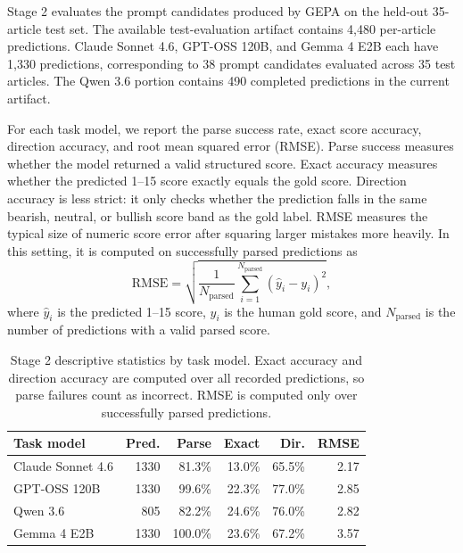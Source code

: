 \documentclass[sigconf,screen]{acmart}
\renewcommand{\arraystretch}{1.05}
\begin{document}
Stage 2 evaluates the prompt candidates produced by GEPA on the held-out
35-article test set. The available test-evaluation artifact contains 4,480
per-article predictions. Claude Sonnet 4.6, GPT-OSS 120B, and Gemma 4 E2B each
have 1,330 predictions, corresponding to 38 prompt candidates evaluated across
35 test articles. The Qwen 3.6 portion contains 490 completed predictions in
the current artifact.

For each task model, we report the parse success rate, exact score accuracy,
direction accuracy, and root mean squared error (RMSE). Parse success measures
whether the model returned a valid structured score. Exact accuracy measures
whether the predicted 1--15 score exactly equals the gold score. Direction
accuracy is less strict: it only checks whether the prediction falls in the
same bearish, neutral, or bullish score band as the gold label. RMSE measures
the typical size of numeric score error after squaring larger mistakes more
heavily. In this setting, it is computed on successfully parsed predictions as
\begin{equation}
\mathrm{RMSE}
=
\sqrt{
\frac{1}{N_{\mathrm{parsed}}}
\sum_{i=1}^{N_{\mathrm{parsed}}}
(\hat{y}_i - y_i)^2
},
\end{equation}
where $\hat{y}_i$ is the predicted 1--15 score, $y_i$ is the human gold score,
and $N_{\mathrm{parsed}}$ is the number of predictions with a valid parsed
score.

\begin{table}[t]
    \centering
    \small
    \setlength{\tabcolsep}{3pt}
    \renewcommand{\arraystretch}{1.1}
    \begin{tabular}{lrrrrr}
        \hline
        \textbf{Task model} & \textbf{Pred.} & \textbf{Parse} &
        \textbf{Exact} & \textbf{Dir.} & \textbf{RMSE} \\
        \hline
        Claude Sonnet 4.6 & 1330 & 81.3\% & 13.0\% & 65.5\% & 2.17 \\
        GPT-OSS 120B & 1330 & 99.6\% & 22.3\% & 77.0\% & 2.85 \\
        Qwen 3.6 & 805 & 82.2\% & 24.6\% & 76.0\% & 2.82 \\
        Gemma 4 E2B & 1330 & 100.0\% & 23.6\% & 67.2\% & 3.57 \\
        \hline
    \end{tabular}
    \caption{Stage 2 descriptive statistics by task model. Exact accuracy and
    direction accuracy are computed over all recorded predictions, so parse
    failures count as incorrect. RMSE is computed only over successfully parsed
    predictions.}
    \label{tab:stage2_test_eval_stats}
\end{table}
\end{document}
